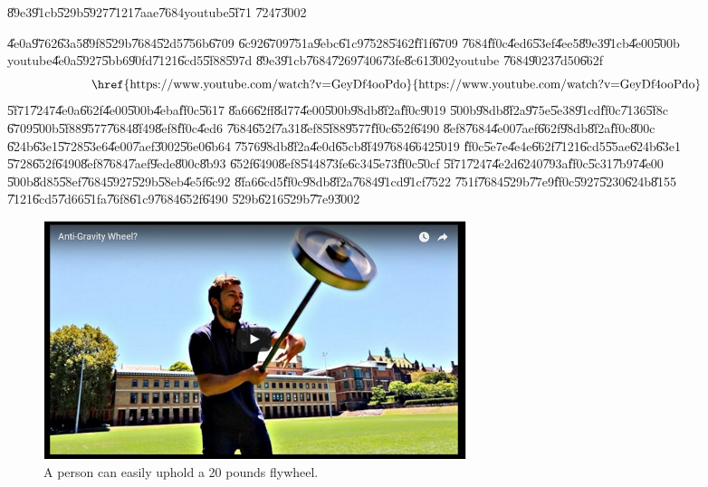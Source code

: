 \begin{case}
\U{89e3}\U{91cb}\U{529b}\U{5927}\U{7121}\U{7aae}\U{7684}youtube\U{5f71}%
\U{7247}\U{3002}
\end{case}

\bigskip

\U{4e0a}\U{9762}\U{63a5}\U{89f8}\U{529b}\U{7684}\U{52d5}\U{756b}\U{6709}%
\U{6c92}\U{6709}\U{751a}\U{9ebc}\U{61c9}\U{7528}\U{5462}\U{ff1f}\U{6709}%
\U{7684}\U{ff0c}\U{4ed6}\U{53ef}\U{4ee5}\U{89e3}\U{91cb}\U{4e00}\U{500b}%
youtube\U{4e0a}\U{5927}\U{5bb6}\U{90fd}\U{7121}\U{6cd5}\U{5f88}\U{597d}%
\U{89e3}\U{91cb}\U{7684}\U{7269}\U{7406}\U{73fe}\U{8c61}\U{3002}youtube%
\U{7684}\U{9023}\U{7d50}\U{662f}%
\begin{equation*}
\text{\href{https://www.youtube.com/watch?v=GeyDf4ooPdo}{%
https://www.youtube.com/watch?v=GeyDf4ooPdo}}
\end{equation*}%
\U{5f71}\U{7247}\U{4e0a}\U{662f}\U{4e00}\U{500b}\U{4eba}\U{ff0c}\U{5617}%
\U{8a66}\U{62ff}\U{8d77}\U{4e00}\U{500b}\U{98db}\U{8f2a}\U{ff0c}\U{9019}%
\U{500b}\U{98db}\U{8f2a}\U{975e}\U{5e38}\U{91cd}\U{ff0c}\U{7136}\U{5f8c}%
\U{6709}\U{500b}\U{5f88}\U{9577}\U{7684}\U{8f49}\U{8ef8}\U{ff0c}\U{4ed6}%
\U{7684}\U{652f}\U{7a31}\U{8ef8}\U{5f88}\U{9577}\U{ff0c}\U{652f}\U{6490}%
\U{8ef8}\U{7684}\U{4e00}\U{7aef}\U{662f}\U{98db}\U{8f2a}\U{ff0c}\U{800c}%
\U{624b}\U{63e1}\U{5728}\U{53e6}\U{4e00}\U{7aef}\U{3002}\U{56e0}\U{6b64}%
\U{7576}\U{98db}\U{8f2a}\U{4e0d}\U{65cb}\U{8f49}\U{7684}\U{6642}\U{5019}%
\U{ff0c}\U{5e7e}\U{4e4e}\U{662f}\U{7121}\U{6cd5}\U{55ae}\U{624b}\U{63e1}%
\U{5728}\U{652f}\U{6490}\U{8ef8}\U{7684}\U{7aef}\U{9ede}\U{800c}\U{8b93}%
\U{652f}\U{6490}\U{8ef8}\U{5448}\U{73fe}\U{6c34}\U{5e73}\U{ff0c}\U{50cf}%
\U{5f71}\U{7247}\U{4e2d}\U{6240}\U{793a}\U{ff0c}\U{5c31}\U{7b97}\U{4e00}%
\U{500b}\U{8d85}\U{58ef}\U{7684}\U{5927}\U{529b}\U{58eb}\U{4e5f}\U{6c92}%
\U{8fa6}\U{6cd5}\U{ff0c}\U{98db}\U{8f2a}\U{7684}\U{91cd}\U{91cf}\U{7522}%
\U{751f}\U{7684}\U{529b}\U{77e9}\U{ff0c}\U{5927}\U{5230}\U{624b}\U{8155}%
\U{7121}\U{6cd5}\U{7d66}\U{51fa}\U{76f8}\U{61c9}\U{7684}\U{652f}\U{6490}%
\U{529b}\U{6216}\U{529b}\U{77e9}\U{3002}

\begin{figure}[th]
\caption{A person can easily uphold a 20 pounds flywheel.}
\begin{center}
\includegraphics[width=0.6\textwidth]{./figs/hercules.png}
\end{center}
\end{figure}

